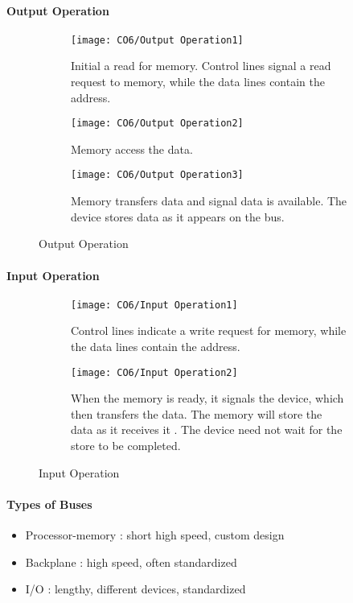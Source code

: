 \paragraph{Output Operation}\quad 
\begin{figure}[!htb]
    \centering
    \begin{subfigure}{0.42\textwidth}
        \centering
        \texttt{[image: CO6/Output Operation1]}
        \caption{\footnotesize  Initial a read for memory. Control lines signal a read request to memory, while the data lines contain the address. }
    \end{subfigure}
    \begin{subfigure}{0.42\textwidth}
        \centering
        \texttt{[image: CO6/Output Operation2]}
        \caption{\footnotesize  Memory access the data.}
    \end{subfigure}
    \begin{subfigure}{0.42\textwidth}
        \centering
        \texttt{[image: CO6/Output Operation3]}
        \caption{\footnotesize  Memory transfers data and signal data is available. The device stores data as it appears on the bus.}
    \end{subfigure}
    \caption{Output Operation}
\end{figure}

\paragraph{Input Operation}\quad
\begin{figure}[!htb]
    \centering
    \begin{subfigure}{0.42\textwidth}
        \centering
        \texttt{[image: CO6/Input Operation1]}
        \caption{\footnotesize Control lines indicate a write request for memory, while the data lines contain the address.}
    \end{subfigure}
    \begin{subfigure}{0.42\textwidth}
        \centering
        \texttt{[image: CO6/Input Operation2]}
        \caption{\footnotesize When the memory is ready, it signals the device, which then transfers the data. The memory will store the data as it receives it . The device need not wait for the store to be completed.}
    \end{subfigure}
    \caption{Input Operation}
\end{figure}

\paragraph{Types of Buses}
\begin{itemize}\small
    \item Processor-memory : short high speed, custom design
    \item Backplane : high speed, often standardized
    \item I/O : lengthy, different devices, standardized
\end{itemize}

